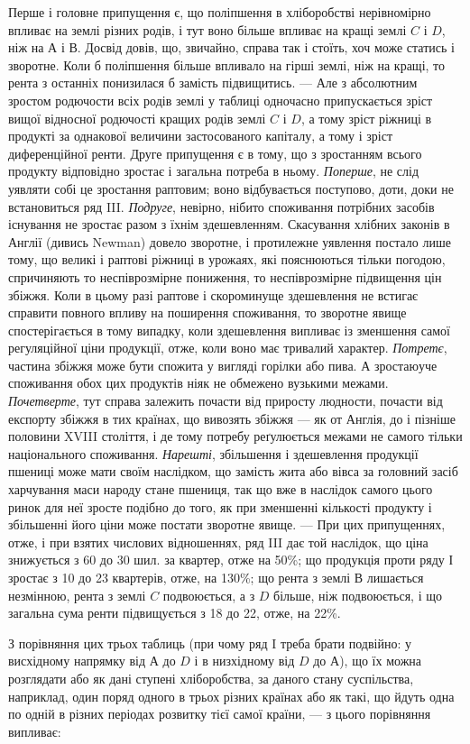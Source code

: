 
Перше і головне припущення є, що поліпшення в хліборобстві нерівномірно
впливає на землі різних родів, і тут воно більше впливає на кращі землі
$C$ і $D$, ніж на $А$ і $В$. Досвід довів, що, звичайно, справа так і стоїть, хоч може
статись і зворотне. Коли б поліпшення більше впливало на гірші землі, ніж на
кращі, то рента з останніх понизилася б замість підвищитись. — Але з абсолютним
зростом родючости всіх родів землі у таблиці одночасно припускається зріст
вищої відносної родючості кращих родів землі $C$ і $D$, а тому зріст ріжниці в продукті за однакової
величини застосованого капіталу, а тому і зріст диференційної ренти.
Друге припущення є в тому, що з зростанням всього продукту відповідно зростає і загальна потреба в
ньому. \emph{Поперше}, не слід уявляти собі це зростання раптовим; воно відбувається поступово, доти, доки
не встановиться ряд III. \emph{Подруге}, невірно, нібито споживання потрібних засобів існування не зростає разом з їхнім
здешевленням. Скасування хлібних законів в Англії (дивись Newman) довело зворотне, і протилежне
уявлення постало лише тому, що великі і раптові ріжниці в урожаях, які пояснюються тільки погодою,
спричиняють то неспіврозмірне пониження, то неспіврозмірне підвищення цін збіжжя.
Коли в цьому разі раптове і скороминуще здешевлення не встигає справити повного впливу на поширення
споживання, то зворотне явище спостерігається в тому випадку, коли здешевлення випливає із зменшення
самої регуляційної ціни продукції, отже, коли воно має тривалий характер. \emph{Потретє}, частина збіжжя
може бути спожита у вигляді горілки або пива. А зростаюуче споживання обох цих продуктів ніяк не
обмежено вузькими межами. \emph{Почетверте}, тут справа залежить почасти від приросту людности, почасти
від експорту збіжжя в тих країнах, що вивозять збіжжя — як от Англія, до і
пізніше половини XVIII століття, і де тому потребу реґулюється межами не самого
тільки національного споживання. \emph{Нарешті}, збільшення і здешевлення
продукції пшениці може мати своїм наслідком, що замість жита або вівса за
головний засіб харчування маси народу стане пшениця, так що вже в наслідок
самого цього ринок для неї зросте подібно до того, як при зменшенні кількості
продукту і збільшенні його ціни може постати зворотне явище. — При цих припущеннях, отже, і при
взятих числових відношеннях, ряд III дає той наслідок,
що ціна знижується з 60 до 30 шил. за квартер, отже на 50\%; що продукція проти ряду І зростає з 10
до 23 квартерів, отже, на 130\%; що рента з землі $В$ лишається незмінною, рента з землі $C$
подвоюється, а з $D$ більше, ніж подвоюється, і що загальна сума ренти підвищується з 18 до 22, отже, на 22\%.

З порівняння цих трьох таблиць (при чому ряд I треба брати подвійно:
у висхідному напрямку від $А$ до $D$ і в низхідному від $D$ до $А$), що їх можна
розглядати або як дані ступені хліборобства, за даного стану суспільства, наприклад,
один поряд одного в трьох різних країнах або як такі, що йдуть одна по одній в різних періодах
розвитку тієї самої країни, — з цього порівняння випливає:
